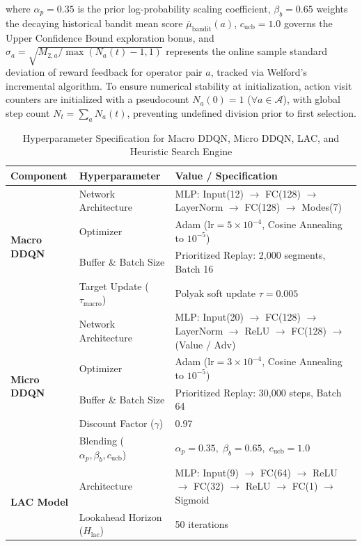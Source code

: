 \documentclass{ieeeaccess}
\begin{document}
where $\alpha_p = 0.35$ is the prior log-probability scaling coefficient, $\beta_b = 0.65$ weights the decaying historical bandit mean score $\bar{\mu}_{\text{bandit}}(a)$, $c_{\text{ucb}} = 1.0$ governs the Upper Confidence Bound exploration bonus, and $\sigma_a = \sqrt{M_{2, a}/\max(N_a(t) - 1, 1)}$ represents the online sample standard deviation of reward feedback for operator pair $a$, tracked via Welford's incremental algorithm. To ensure numerical stability at initialization, action visit counters are initialized with a pseudocount $N_a(0) = 1$ ($\forall a \in \mathcal{A}$), with global step count $N_t = \sum_{a} N_a(t)$, preventing undefined division prior to first selection.

\begin{table}[!t]
\caption{Hyperparameter Specification for Macro DDQN, Micro DDQN, LAC, and Heuristic Search Engine}
\label{tab:hyperparameters}
\centering
\footnotesize
\begin{tabularx}{\columnwidth}{l l X}
\toprule
\textbf{Component} & \textbf{Hyperparameter} & \textbf{Value / Specification} \\
\midrule
\multirow{4}{*}{\textbf{Macro DDQN}} 
  & Network Architecture & MLP: Input(12) $\to$ FC(128) $\to$ LayerNorm $\to$ FC(128) $\to$ Modes(7) \\
  & Optimizer & Adam ($\text{lr} = 5 \times 10^{-4}$, Cosine Annealing to $10^{-5}$) \\
  & Buffer \& Batch Size & Prioritized Replay: 2,000 segments, Batch 16 \\
  & Target Update ($\tau_{\text{macro}}$) & Polyak soft update $\tau = 0.005$ \\
\midrule
\multirow{5}{*}{\textbf{Micro DDQN}} 
  & Network Architecture & MLP: Input(20) $\to$ FC(128) $\to$ LayerNorm $\to$ ReLU $\to$ FC(128) $\to$ (Value / Adv) \\
  & Optimizer & Adam ($\text{lr} = 3 \times 10^{-4}$, Cosine Annealing to $10^{-5}$) \\
  & Buffer \& Batch Size & Prioritized Replay: 30,000 steps, Batch 64 \\
  & Discount Factor ($\gamma$) & 0.97 \\
  & Blending ($\alpha_p, \beta_b, c_{\text{ucb}}$) & $\alpha_p = 0.35, \; \beta_b = 0.65, \; c_{\text{ucb}} = 1.0$ \\
\midrule
\multirow{4}{*}{\textbf{LAC Model}} 
  & Architecture & MLP: Input(9) $\to$ FC(64) $\to$ ReLU $\to$ FC(32) $\to$ ReLU $\to$ FC(1) $\to$ Sigmoid \\
  & Lookahead Horizon ($H_{\text{lac}}$) & 50 iterations \\

\end{tabularx}
\end{table}
\end{document}
